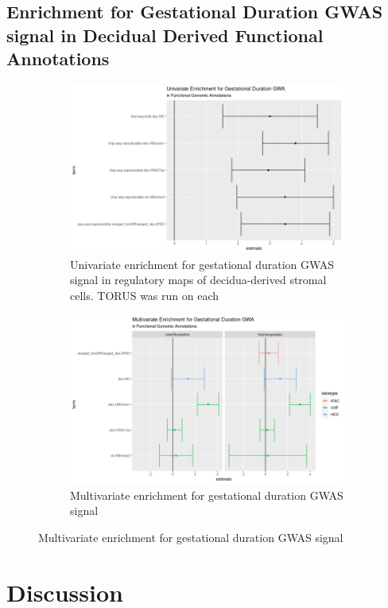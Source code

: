 \subsection{Enrichment for Gestational Duration GWAS signal in Decidual Derived Functional Annotations}

\begin{figure}
  \centering
  \begin{subfigure}[t]{\textwidth}
    \centering
    \includegraphics[width=\linewidth]{img/ptb_univ_assoc.png}
    \caption{Univariate enrichment for gestational duration GWAS signal in regulatory maps of decidua-derived stromal cells. TORUS was run on each }\label{fig:univ_assoc}
  \end{subfigure}
    \begin{subfigure}[t]{\textwidth}
    \centering
    \includegraphics[width=\linewidth]{img/ptb_multiv_assoc.png}
    \caption{Multivariate enrichment for gestational duration GWAS signal}\label{fig:multiv_assoc}
    \end{subfigure}
\end{figure}



\section{Discussion}\label{sec:org53f1196}

